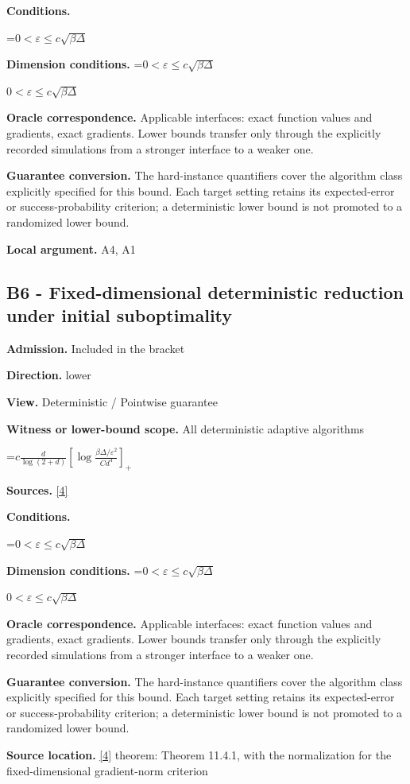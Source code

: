 \documentclass[10pt,a4paper]{article}
\newcommand{\AtlasMath}[1]{\par\begingroup\centering\setbox0=\hbox{$\displaystyle #1$}\ifdim\wd0>1.4\linewidth\typeout{ATLAS WIDE FORMULA: \the\wd0}\fi\ifdim\wd0>\linewidth\resizebox{\linewidth}{!}{\box0}\else\box0\fi\par\endgroup}
\newcommand{\AtlasInlineMath}[1]{\begingroup\setbox0=\hbox{$#1$}\ifdim\wd0>.4\linewidth\endgroup\AtlasMath{#1}\else\endgroup$#1$\fi}
\begin{document}
\textbf{Conditions.} 
\AtlasMath{0<\varepsilon\le c\sqrt{\beta\Delta}}


\textbf{Dimension conditions.} \AtlasInlineMath{0<\varepsilon\le c\sqrt{\beta\Delta}}

\textbf{Oracle correspondence.} Applicable interfaces: exact function values and gradients, exact gradients. Lower bounds transfer only through the explicitly recorded simulations from a stronger interface to a weaker one.

\textbf{Guarantee conversion.} The hard-instance quantifiers cover the algorithm class explicitly specified for this bound. Each target setting retains its expected-error or success-probability criterion; a deterministic lower bound is not promoted to a randomized lower bound.

\textbf{Local argument.} A4, A1

\subsection{B6 - Fixed-dimensional deterministic reduction under initial suboptimality}
\textbf{Admission.} Included in the bracket

\textbf{Direction.} lower

\textbf{View.} Deterministic / Pointwise guarantee

\textbf{Witness or lower-bound scope.} All deterministic adaptive algorithms

\AtlasMath{c\frac d{\log(2+d)}\left[\log\frac{\beta\Delta/\varepsilon^2}{Cd^{4}}\right]_+}
\textbf{Sources.} \href{https://www2.isye.gatech.edu/~nemirovs/LecEMCO.pdf}{[4]}

\textbf{Conditions.} 
\AtlasMath{0<\varepsilon\le c\sqrt{\beta\Delta}}


\textbf{Dimension conditions.} \AtlasInlineMath{0<\varepsilon\le c\sqrt{\beta\Delta}}

\textbf{Oracle correspondence.} Applicable interfaces: exact function values and gradients, exact gradients. Lower bounds transfer only through the explicitly recorded simulations from a stronger interface to a weaker one.

\textbf{Guarantee conversion.} The hard-instance quantifiers cover the algorithm class explicitly specified for this bound. Each target setting retains its expected-error or success-probability criterion; a deterministic lower bound is not promoted to a randomized lower bound.

\textbf{Source location.} \href{https://www2.isye.gatech.edu/~nemirovs/LecEMCO.pdf}{[4]} theorem: Theorem 11.4.1, with the normalization for the fixed-dimensional gradient-norm criterion
\end{document}

